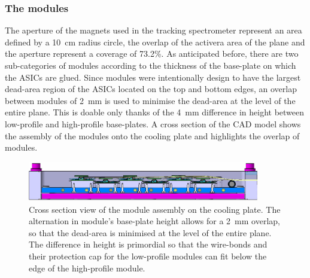 %				
%		


			\subsubsection{The modules} 
			The aperture of the magnets used in the tracking spectrometer represent an area defined by a \SI{10}{\centi\meter} radius circle, the overlap of the activera area of the plane and the aperture represent a coverage of 73.2\%. As anticipated before, there are two sub-categories of modules according to the thickness of the base-plate on which the ASICs are glued. Since modules were intentionally design to have the largest dead-area region of the ASICs located on the top and bottom edges, an overlap between modules of \SI{2}{\milli\meter} is used to minimise the dead-area at the level of the entire plane. This is doable only thanks of the \SI{4}{\milli\meter} difference in height between low-profile and high-profile base-plates. A cross section of the CAD model shows the assembly of the modules onto the cooling plate and highlights the overlap of modules.
				\begin{figure}[h]
					\centering
					\includegraphics[width=0.9\textwidth]{files/CAD_plane_XS}
					\caption{Cross section view of the module assembly on the cooling plate. The alternation in module's base-plate height allows for a \SI{2}{\milli\meter} overlap, so that the dead-area is minimised at the level of the entire plane. The difference in height is primordial so that the wire-bonds and their protection cap for the low-profile modules can fit below the edge of the high-profile module.}
					\label{im:CAD_plane_XS}
				\end{figure}
				
